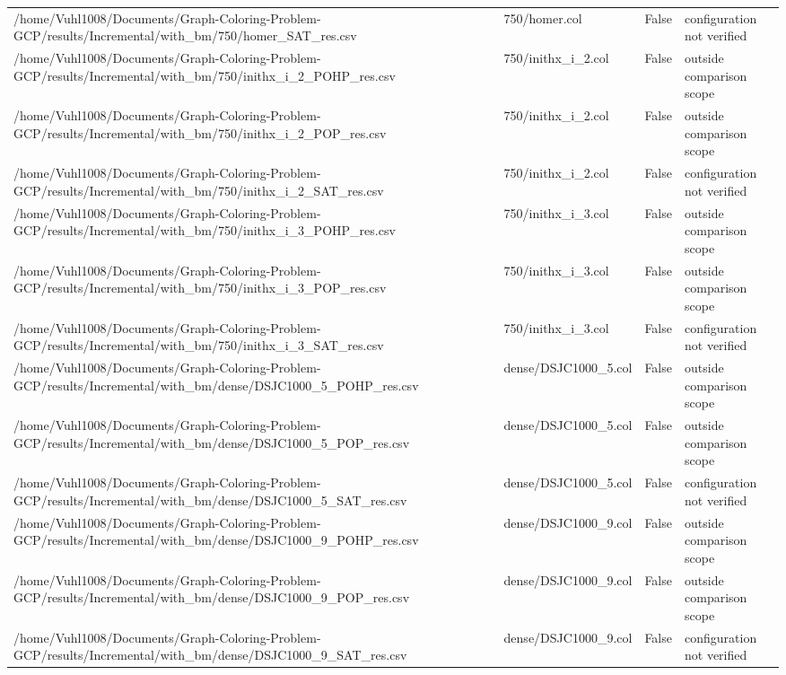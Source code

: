 \begin{table}[htbp]
\begin{tabular}{llll}
/home/Vuhl1008/Documents/Graph-Coloring-Problem-GCP/results/Incremental/with\_bm/750/homer\_SAT\_res.csv & 750/homer.col & False & configuration not verified \\
/home/Vuhl1008/Documents/Graph-Coloring-Problem-GCP/results/Incremental/with\_bm/750/inithx\_i\_2\_POHP\_res.csv & 750/inithx\_i\_2.col & False & outside comparison scope \\
/home/Vuhl1008/Documents/Graph-Coloring-Problem-GCP/results/Incremental/with\_bm/750/inithx\_i\_2\_POP\_res.csv & 750/inithx\_i\_2.col & False & outside comparison scope \\
/home/Vuhl1008/Documents/Graph-Coloring-Problem-GCP/results/Incremental/with\_bm/750/inithx\_i\_2\_SAT\_res.csv & 750/inithx\_i\_2.col & False & configuration not verified \\
/home/Vuhl1008/Documents/Graph-Coloring-Problem-GCP/results/Incremental/with\_bm/750/inithx\_i\_3\_POHP\_res.csv & 750/inithx\_i\_3.col & False & outside comparison scope \\
/home/Vuhl1008/Documents/Graph-Coloring-Problem-GCP/results/Incremental/with\_bm/750/inithx\_i\_3\_POP\_res.csv & 750/inithx\_i\_3.col & False & outside comparison scope \\
/home/Vuhl1008/Documents/Graph-Coloring-Problem-GCP/results/Incremental/with\_bm/750/inithx\_i\_3\_SAT\_res.csv & 750/inithx\_i\_3.col & False & configuration not verified \\
/home/Vuhl1008/Documents/Graph-Coloring-Problem-GCP/results/Incremental/with\_bm/dense/DSJC1000\_5\_POHP\_res.csv & dense/DSJC1000\_5.col & False & outside comparison scope \\
/home/Vuhl1008/Documents/Graph-Coloring-Problem-GCP/results/Incremental/with\_bm/dense/DSJC1000\_5\_POP\_res.csv & dense/DSJC1000\_5.col & False & outside comparison scope \\
/home/Vuhl1008/Documents/Graph-Coloring-Problem-GCP/results/Incremental/with\_bm/dense/DSJC1000\_5\_SAT\_res.csv & dense/DSJC1000\_5.col & False & configuration not verified \\
/home/Vuhl1008/Documents/Graph-Coloring-Problem-GCP/results/Incremental/with\_bm/dense/DSJC1000\_9\_POHP\_res.csv & dense/DSJC1000\_9.col & False & outside comparison scope \\
/home/Vuhl1008/Documents/Graph-Coloring-Problem-GCP/results/Incremental/with\_bm/dense/DSJC1000\_9\_POP\_res.csv & dense/DSJC1000\_9.col & False & outside comparison scope \\
/home/Vuhl1008/Documents/Graph-Coloring-Problem-GCP/results/Incremental/with\_bm/dense/DSJC1000\_9\_SAT\_res.csv & dense/DSJC1000\_9.col & False & configuration not verified \\

\end{tabular}
\end{table}

